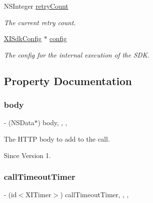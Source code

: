 \begin{DoxyCompactItemize}
N\+S\+Integer \hyperlink{category_x_i_robust_r_e_s_t_call_07_08_a8746f2e98cc9cf9ef30e07106fa39935}{retry\+Count}
\begin{DoxyCompactList}\small\item\em The current retry count. \end{DoxyCompactList}\item 
\hyperlink{class_x_i_sdk_config}{X\+I\+Sdk\+Config} $\ast$ \hyperlink{category_x_i_robust_r_e_s_t_call_07_08_a8ac7eacb7f3346f88d205472982f08fe}{config}
\begin{DoxyCompactList}\small\item\em The config for the internal execution of the S\+DK. \end{DoxyCompactList}\end{DoxyCompactItemize}


\subsection{Property Documentation}
\hypertarget{category_x_i_robust_r_e_s_t_call_07_08_a9b04700bffe91efc03700dc8b69b5e2b}{}\label{category_x_i_robust_r_e_s_t_call_07_08_a9b04700bffe91efc03700dc8b69b5e2b} 
\subsubsection{\texorpdfstring{body}{body}}
{\footnotesize\ttfamily -\/ (N\+S\+Data$\ast$) body\hspace{0.3cm}{\ttfamily [read]}, {\ttfamily [write]}, {\ttfamily [nonatomic]}, {\ttfamily [strong]}}



The H\+T\+TP body to add to the call. 

\begin{DoxySince}{Since}
Version 1. 
\end{DoxySince}
\hypertarget{category_x_i_robust_r_e_s_t_call_07_08_abcd9232ef75177aa6fa882050044f97b}{}\label{category_x_i_robust_r_e_s_t_call_07_08_abcd9232ef75177aa6fa882050044f97b} 
\subsubsection{\texorpdfstring{call\+Timeout\+Timer}{callTimeoutTimer}}
{\footnotesize\ttfamily -\/ (id$<$X\+I\+Timer$>$) call\+Timeout\+Timer\hspace{0.3cm}{\ttfamily [read]}, {\ttfamily [write]}, {\ttfamily [nonatomic]}, {\ttfamily [strong]}}



